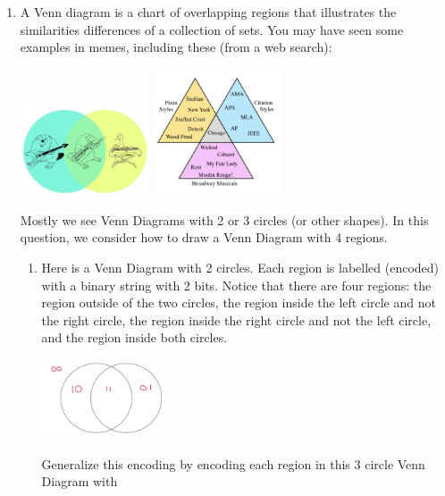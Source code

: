 \begin{enumerate}[labelindent=0pt, leftmargin=0pt]
\begin{enumerate}
    \item \gradeComplete A Venn diagram is a chart of overlapping regions that illustrates the similarities
    differences of a collection of sets. You may have seen some examples in memes, including
    these (from a web search):
    \begin{center}
        \hfill\includegraphics[width=1.5in]{../../resources/images/funny-pictures-venn-diagram-duck-5448120.jpeg} \hfill
        \includegraphics[width=1.5in]{../../resources/images/detroit-ap-chicago-ieee-wood-fired-wicked-cabaret-my-fair-lady-rent-moulin-rouge-broadway-musicals.png}
        \hfill
    \end{center}
    Mostly we see Venn Diagrams with 2 or 3 circles (or other shapes). In this question, 
    we consider how to draw a Venn Diagram with 4 regions.
    \begin{enumerate}
        \item Here is a Venn Diagram with 2 circles. Each region is labelled (encoded) with a 
        binary string with 2 bits. Notice that there are four regions: the region outside
        of the two circles, the region inside the left circle and not the right circle, the region 
        inside the right circle and not the left circle, and the region inside both circles.
        \begin{center}
            \includegraphics[width=1.5in]{../../resources/images/VennDiagram2Circles.png}
        \end{center}
        Generalize this encoding by encoding each region in this 3 circle Venn Diagram with 

\end{enumerate}
\end{enumerate}
\end{enumerate}
